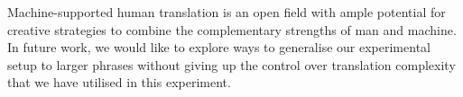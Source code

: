 \documentclass[output=paper]{LSP/langsci}
\begin{document}
Machine-supported human translation is an open field with ample
potential for creative strategies to combine the complementary
strengths of man and machine. In future work, we would like to explore
ways to generalise our experimental setup to larger phrases without
giving up the control over translation complexity that we have
utilised in this experiment.



%


%




\end{document}
